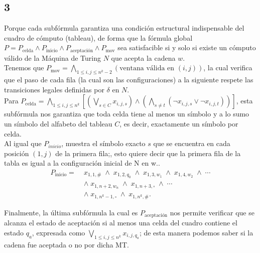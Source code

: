 \subsection{3}

    Porque cada subfórmula garantiza una condición estructural indispensable del cuadro de cómputo (tableau), de forma que la fórmula global $P = P_{\text{celda}} \land P_{\text{inicio}} \land P_{\text{aceptación}} \land P_{\text{mov}}$ sea satisfacible si y solo si existe un cómputo válido de la Máquina de Turing $N$ que acepta la cadena $w$.\\

    Tenemos que $P_{\text{mov}} = \bigwedge_{1 \le i,j \le n^k - 2} (\text{ventana válida en } (i,j))$, la cual verifica que el paso de cada fila (la cual son las configuraciones) a la siguiente respete las transiciones legales definidas por $\delta$ en $N$.\\
    
    Para $P_{\text{celda}} = \bigwedge_{1 \le i,j \le n^k} \left[ \left(\bigvee_{s \in C} x_{i,j,s}\right) \land \left(\bigwedge_{s \neq t} (\neg x_{i,j,s} \lor \neg x_{i,j,t})\right) \right]$, esta subfórmula nos garantiza que toda celda tiene al menos un símbolo y a lo sumo un símbolo del alfabeto del tableau $C$, es decir, exactamente un símbolo por celda.\\

    Al igual que $P_{inicio}$, muestra el símbolo exacto $s$ que se encuentra en cada posición $(1,j)$ de la primera fila;, esto quiere decir que la primera fila de la tabla es igual a la configuración inicial de N en w..\\

        $$
        \begin{aligned}
        P_{\mathrm{inicio}} =\;&
        x_{1,1,\#}
        \;\wedge\;
        x_{1,2,q_0}
        \;\wedge\;
        x_{1,3,w_1}
        \;\wedge\;
        x_{1,4,w_2}
        \;\wedge\; \cdots \\
        &\wedge\;
        x_{1,n+2,w_n}
        \;\wedge\;
        x_{1,n+3,\square}
        \;\wedge\; \cdots \\
        &\wedge\;
        x_{1,n^k-1,\square}
        \;\wedge\;
        x_{1,n^k,\#}.
        \end{aligned}
        $$

    Finalmente, la última subfórmula la cual es $P_{\text{aceptación}}$ nos permite verificar que se alcanza el estado de aceptación si al menos una celda del cuadro contiene el estado $q_a$, expresada como $\bigvee_{1 \leq i,j \leq n^k} x_{i,j,q_a}$; de esta manera podemos saber si la cadena fue aceptada o no por dicha MT.\\

